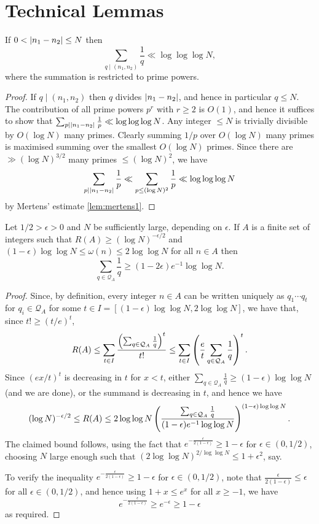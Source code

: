 \chapter{Technical Lemmas}
\label{chap:techlemmas}


\begin{lemma}
  \label{lem:basic}
  \leanok
  If $0<\left\lvert n_1-n_2\right\rvert\leq N$ then
  \[\sum_{q\mid (n_1,n_2)}\frac{1}{q}\ll \log\log\log N,\]
  where the summation is restricted to prime powers.
\end{lemma}
\begin{proof}
  If $q\mid (n_1,n_2)$ then $q$ divides $\left\lvert n_1-n_2\right\rvert$, and hence in particular $q\leq N$. The contribution of all prime powers $p^r$ with $r\geq 2$ is $O(1)$, and hence it suffices to show that $\sum_{p\mid \left\lvert n_1-n_2\right\rvert}\frac{1}{p}\ll \log\log\log N$. Any integer $\leq N$ is trivially divisible by $O(\log N)$ many primes. Clearly summing $1/p$ over $O(\log N)$ many primes is maximised summing over the smallest $O(\log N)$ primes. Since there are $\gg (\log N)^{3/2}$ many primes $\leq (\log N)^2$, we have
  \[\sum_{p\mid \left\lvert n_1-n_2\right\rvert}\frac{1}{p}\ll \sum_{p\leq (\log N)^2}\frac{1}{p}\ll \log\log\log N\]
  by Mertens' estimate \ref{lem:mertens1}.
\end{proof}

\begin{lemma}\label{lem:rtop}
Let $1/2>\epsilon>0$ and $N$ be sufficiently large, depending on $\epsilon$. If $A$ is a finite set of integers such that $R(A)\geq (\log N)^{-\epsilon/2}$ and $(1-\epsilon)\log\log N\leq \omega(n)\leq  2\log\log N$ for all $n\in A$ then
\[\sum_{q\in\mathcal{Q}_A}\frac{1}{q} \geq (1-2\epsilon)e^{-1}\log\log N.\]
\leanok
{}
\end{lemma}
\begin{proof}
Since, by definition, every integer $n\in A$ can be written uniquely as $q_1\cdots q_t$ for $q_i\in \mathcal{Q}_A$ for some $t\in I = [(1-\epsilon)\log\log N, 2\log\log N]$, we have that, since $t!\geq (t/e)^t$,
\[R(A)\leq  \sum_{t\in I}\frac{\left( \sum_{q\in \mathcal{Q}_A}\frac{1}{q}\right)^t}{t!}\leq \sum_{t\in I}\left( \frac{e}{t}\sum_{q\in \mathcal{Q}_A}\frac{1}{q}\right)^t.\]
Since $(ex/t)^t$ is decreasing in $t$ for $x<t$, either $\sum_{q\in \mathcal{Q}_A}\frac{1}{q}\geq (1-\epsilon)\log\log N$ (and we are done), or the summand is decreasing in $t$, and hence we have
\[(\log N)^{-\epsilon/2}\leq R(A)\leq 2\log\log N\left( \frac{\sum_{q\in \mathcal{Q}_A}\frac{1}{q}}{(1-\epsilon)e^{-1}\log\log N}\right)^{(1-\epsilon)\log\log N}.\]
The claimed bound follows, using the fact that $e^{-\frac{\epsilon}{2(1-\epsilon)}}\geq 1-\epsilon$ for $\epsilon\in (0,1/2)$, choosing $N$ large enough such that $(2\log\log N)^{2/\log\log N}\leq 1+\epsilon^2$, say.

To verify the inequality $e^{-\frac{\epsilon}{2(1-\epsilon)}}\geq 1-\epsilon$ for $\epsilon\in (0,1/2)$, note that $\frac{\epsilon}{2(1-\epsilon)}\leq \epsilon$ for all $\epsilon\in (0,1/2)$, and hence using $1+x\leq e^{x}$ for all $x\geq -1$, we have 
\[e^{-\frac{\epsilon}{2(1-\epsilon)}}\geq e^{-\epsilon}\geq 1-\epsilon\]
as required. 
\end{proof}

